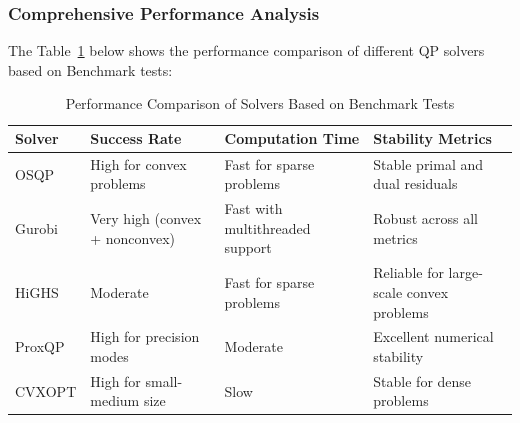 \documentclass{article}
\begin{document}
\subsubsection{Comprehensive Performance Analysis}
The Table~\ref{tab:benchmark-performance} below shows the performance comparison of different QP solvers based on Benchmark tests:
\begin{table}[ht]
\centering
\caption{Performance Comparison of Solvers Based on Benchmark Tests}
\begin{adjustbox}{max width=\textwidth}
\begin{tabular}{|l|l|l|l|}
\hline
\textbf{Solver}    & \textbf{Success Rate}          & \textbf{Computation Time}           & \textbf{Stability Metrics}                     \\ \hline
OSQP               & High for convex problems       & Fast for sparse problems            & Stable primal and dual residuals               \\ \hline
Gurobi             & Very high (convex + nonconvex) & Fast with multithreaded support     & Robust across all metrics                      \\ \hline
HiGHS              & Moderate                      & Fast for sparse problems            & Reliable for large-scale convex problems       \\ \hline
ProxQP             & High for precision modes       & Moderate                            & Excellent numerical stability                  \\ \hline
CVXOPT             & High for small-medium size     & Slow                                & Stable for dense problems                      \\ \hline
\end{tabular}
\end{adjustbox}
\label{tab:benchmark-performance}
\end{table}
\end{document}
